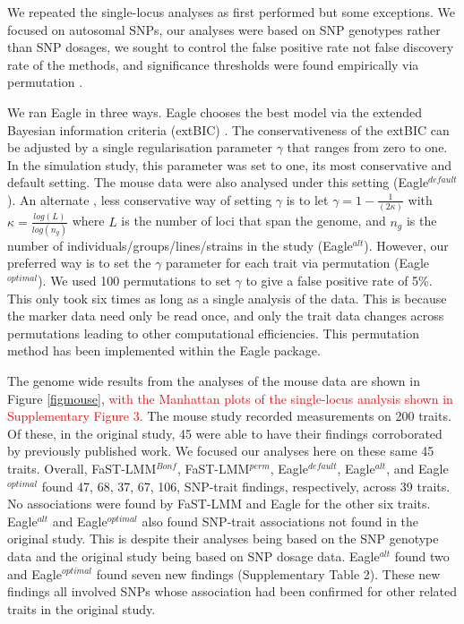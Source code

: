\documentclass{bioinfo}
\begin{document}
We repeated the single-locus analyses as first performed \citep{nicod2016genome} but some exceptions. We 
focused on autosomal SNPs, our analyses were based on SNP genotypes  rather than SNP dosages, 
we sought to control the false positive rate not false discovery rate of the methods, and significance thresholds were 
found empirically via permutation \textcolor{red}{\citep{doerge1996permutation}}.


We ran Eagle in three ways. 
Eagle chooses the best model via the extended Bayesian information criteria (extBIC) \citep{chen2008extended}. 
  The conservativeness of the extBIC can be adjusted by a single regularisation parameter  $\gamma$ that ranges from zero to one. 
In the simulation study, this parameter was set to one, its most conservative and default setting. The mouse data were also analysed 
under this setting (Eagle$^{default}$).  An alternate  \citep{chen2008extended}, less conservative way of setting $\gamma$ is to  let $\gamma = 1 - \frac{1}{(2\kappa)}$ with $\kappa=\frac{log(L)}{log(n_g)}$ where 
 $L$ is the number of loci that span the genome, and $n_g$ is the number of individuals/groups/lines/strains in the study
  (Eagle$^{alt}$). However, our preferred way is to set the $\gamma$ parameter for each trait via permutation (Eagle$^{optimal}$).  We used 100 permutations to set $\gamma$ to give a false  positive rate of 5\%.  This only took six times as long as a single analysis of the data. This is because the marker data need only be read  once, 
 and only the trait data changes across permutations leading to other computational efficiencies.  
  This permutation method has been implemented within the
 Eagle package. 
  
  
The genome wide results from the analyses of the mouse data are shown in Figure  \ref{figmouse}, 
\textcolor{red}{
with the Manhattan plots of the 
single-locus analysis shown in Supplementary Figure 3.} 
The mouse study recorded
measurements on 200 traits. Of these, in the original study, 45 were able to have their findings  corroborated by previously published work. We focused 
our analyses here on these same 45 traits. Overall,  FaST-LMM$^{Bonf}$,  FaST-LMM$^{perm}$, Eagle$^{default}$, Eagle$^{alt}$, and Eagle$^{optimal}$ found 47, 68, 37, 67, 106, SNP-trait findings, respectively, across 39 traits. No associations were found by FaST-LMM and Eagle for the other six traits. 
Eagle$^{alt}$ and Eagle$^{optimal}$ also found SNP-trait associations not found in the original study. This is despite their analyses being based 
on the SNP genotype data and the original study being based on SNP dosage data. Eagle$^{alt}$ found two  and 
Eagle$^{optimal}$ found seven new findings (Supplementary Table 2).  These new findings all involved SNPs whose association had been confirmed for other related traits in the original 
study. 
\end{document}
